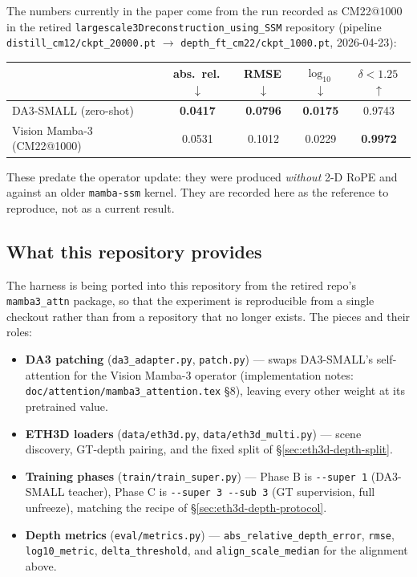 \documentclass[11pt,a4paper]{article}
\begin{document}
The numbers currently in the paper come from the run recorded as CM22@1000 in
the retired \texttt{largescale3Dreconstruction\_using\_SSM} repository
(pipeline \texttt{distill\_cm12/ckpt\_20000.pt} $\rightarrow$
\texttt{depth\_ft\_cm22/ckpt\_1000.pt}, 2026-04-23):

\begin{center}
\begin{tabular}{lcccc}
\toprule
 & abs.\ rel.\,$\downarrow$ & RMSE\,$\downarrow$ & $\log_{10}$\,$\downarrow$ & $\delta{<}1.25$\,$\uparrow$ \\
\midrule
DA3-SMALL (zero-shot)     & \textbf{0.0417} & \textbf{0.0796} & \textbf{0.0175} & 0.9743 \\
Vision Mamba-3 (CM22@1000) & 0.0531 & 0.1012 & 0.0229 & \textbf{0.9972} \\
\bottomrule
\end{tabular}
\end{center}

\noindent These predate the operator update: they were produced \emph{without}
2-D RoPE and against an older \texttt{mamba-ssm} kernel. They are recorded here
as the reference to reproduce, not as a current result.

\subsection{What this repository provides}
\label{sec:eth3d-depth-harness}

The harness is being ported into this repository from the retired repo's
\texttt{mamba3\_attn} package, so that the experiment is reproducible from a
single checkout rather than from a repository that no longer exists. The pieces
and their roles:

\begin{itemize}
  \item \textbf{DA3 patching} (\texttt{da3\_adapter.py}, \texttt{patch.py}) ---
        swaps DA3-SMALL's self-attention for the Vision Mamba-3 operator
        (implementation notes: \texttt{doc/attention/mamba3\_attention.tex}
        \S8), leaving every other weight at its pretrained value.
  \item \textbf{ETH3D loaders} (\texttt{data/eth3d.py},
        \texttt{data/eth3d\_multi.py}) --- scene discovery, GT-depth pairing,
        and the fixed split of \S\ref{sec:eth3d-depth-split}.
  \item \textbf{Training phases} (\texttt{train/train\_super.py}) --- Phase B is
        \texttt{-{}-super 1} (DA3-SMALL teacher), Phase C is
        \texttt{-{}-super 3 -{}-sub 3} (GT supervision, full unfreeze), matching
        the recipe of \S\ref{sec:eth3d-depth-protocol}.
  \item \textbf{Depth metrics} (\texttt{eval/metrics.py}) ---
        \texttt{abs\_relative\_depth\_error}, \texttt{rmse},
        \texttt{log10\_metric}, \texttt{delta\_threshold}, and
        \texttt{align\_scale\_median} for the alignment above.
\end{itemize}
\end{document}

